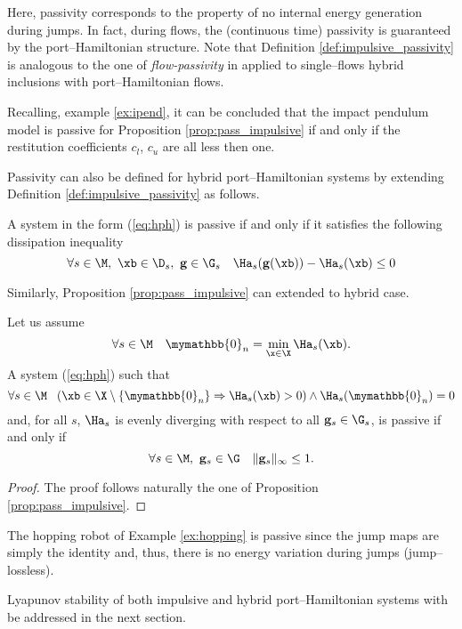 %
Here, passivity corresponds to the property of no internal energy generation during jumps. In fact, during flows, the (continuous time) passivity is guaranteed by the port--Hamiltonian structure.
Note that Definition \ref{def:impulsive_passivity} is analogous to the one of \textit{flow-passivity} in \cite{naldi2013passivity} applied to single--flows hybrid inclusions with port--Hamiltonian flows. 
%
\begin{rem}
    Recalling, example \ref{ex:ipend}, it can be concluded that the impact pendulum model is passive for Proposition \ref{prop:pass_impulsive} if and only if the restitution coefficients $c_l$, $c_u$ are all less then one.
\end{rem}
%
Passivity can also be defined for hybrid port--Hamiltonian systems by extending Definition \ref{def:impulsive_passivity} as follows.
%
\begin{defn} \label{def:hybrid_passivity}
    A system in the form (\ref{eq:hph}) is passive if and only if it satisfies the following dissipation inequality
    \begin{equation}
        \forall s\in\M,~\xb\in\D_s,~\mathbf{g}\in\G_s \quad \Ha_s(\mathbf{g}(\xb))-\Ha_s(\xb)\leq 0
    \end{equation}
\end{defn}
%
Similarly, Proposition \ref{prop:pass_impulsive} can extended to hybrid case.
%
\begin{prop}\label{prop:pass_hybrid}
	Let us assume
	\begin{equation}
	    \forall s\in\M\quad \mymathbb{0}_n = \min_{\x\in\X}\Ha_s(\xb).
	\end{equation}
	A system (\ref{eq:hph}) such that 
	\begin{equation}
	    \forall s\in\M~~\left(\xb\in\X\setminus\{\mymathbb{0}_n\}\Rightarrow\Ha_s(\xb)>0\right) \land\Ha_s(\mymathbb{0}_n)=0
	\end{equation}
	and, for all $s$, $\Ha_s$ is evenly diverging with respect to all $\mathbf{g}_s\in\G_s$, is passive if and only if 
	\begin{equation}%
		\forall s\in\M,~\mathbf{g}_s\in\G\quad\|\mathbf{g}_s\|_\infty\leq 1.
	\end{equation}
\end{prop}
%
\begin{proof}
    The proof follows naturally the one of Proposition \ref{prop:pass_impulsive}.
\end{proof}
%
\begin{rem}
The hopping robot of Example \ref{ex:hopping} is passive since the jump maps are simply the identity and, thus, there is no energy variation during jumps (jump--lossless). 
\end{rem}
%
Lyapunov stability of both impulsive and hybrid port--Hamiltonian systems with be addressed in the next section.
%
\clearpage
